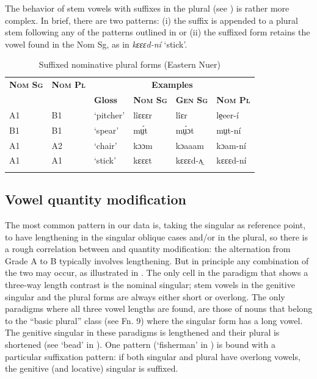 \documentclass[output=paper
,newtxmath
,modfonts
,nonflat]{langsci/langscibook}
\begin{document}
The behavior of stem vowels with suffixes in the  plural (see ) is rather more complex. In brief, there are two patterns: (i) the suffix is appended to a plural stem following any of the patterns outlined in  or (ii) the suffixed form retains the vowel found in the Nom Sg, as in \textit{kɛɛɛd-ní} ‘stick’.

\begin{table}
\begin{tabularx}{\textwidth}{ll XXXX}
\lsptoprule

\bfseries\scshape Nom Sg & \bfseries\scshape Nom Pl & \multicolumn{4}{c}{\bfseries Examples}\\
\cmidrule{3-6}
&  & \bfseries Gloss & \bfseries\scshape Nom Sg & \bfseries\scshape Gen Sg & \bfseries\scshape Nom Pl\\
\midrule
A1 & B1 & ‘pitcher’ & lîɛɛɛr & lîɛr & le̤eer-í\\
B1 & B1 & ‘spear’ & mṳ́t & mṳ́ɔt & mṳt-ní\\
A1 & A2 & ‘chair’ & kɔɔm & kɔaaam & kɔam-ní\\
A1 & A1 & ‘stick’ & kɛɛɛt & kɛɛɛd-ʌ̤ & kɛɛɛd-ní\\
\lspbottomrule
\end{tabularx}
\caption{Suffixed nominative plural forms (Eastern Nuer)}
\label{tab:monich:19}
\end{table}

\subsection{Vowel quantity modification} %

The most common pattern in our data is, taking the  singular as reference point, to have lengthening in the singular oblique cases and/or in the plural, so there is a rough correlation between  and quantity modification: the alternation from Grade A to B typically involves lengthening.  But in principle any combination of the two may occur, as illustrated in . The only cell in the paradigm that shows a three-way length contrast is the nominal singular; stem vowels in the genitive singular and the  plural forms are always either short or overlong.  The only paradigms where all three vowel lengths are found, are those of nouns that belong to the “basic plural” class (see Fn. 9) where the  singular form has a long vowel.  The genitive singular in these paradigms is lengthened and their  plural is shortened (see ‘bead’ in ).  One pattern (‘fisherman’ in ) is bound with a particular suffixation pattern:  if both  singular and plural have overlong vowels, the genitive (and locative) singular is suffixed.  
\end{document}
